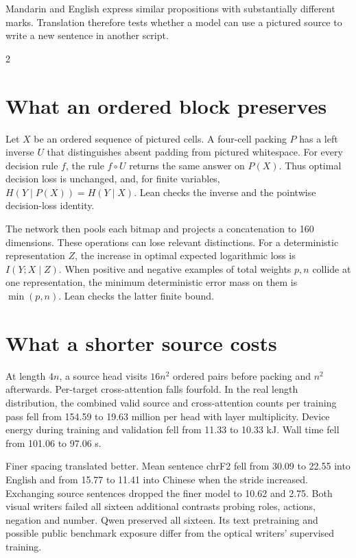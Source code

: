 \newpage
{}
\noindent Mandarin and English express similar propositions with substantially different marks. Translation therefore tests whether a model can use a pictured source to write a new sentence in another script.
\begin{multicols}{2}
\section*{What an ordered block preserves}
Let $X$ be an ordered sequence of pictured cells. A four-cell packing $P$ has a left inverse $U$ that distinguishes absent padding from pictured whitespace. For every decision rule $f$, the rule $f\circ U$ returns the same answer on $P(X)$. Thus optimal decision loss is unchanged, and, for finite variables, $H(Y\mid P(X))=H(Y\mid X)$. Lean checks the inverse and the pointwise decision-loss identity.
\par The network then pools each bitmap and projects a concatenation to 160 dimensions. These operations can lose relevant distinctions. For a deterministic representation $Z$, the increase in optimal expected logarithmic loss is $I(Y;X\mid Z)$. When positive and negative examples of total weights $p,n$ collide at one representation, the minimum deterministic error mass on them is $\min(p,n)$. Lean checks the latter finite bound.
\section*{What a shorter source costs}
At length $4n$, a source head visits $16n^2$ ordered pairs before packing and $n^2$ afterwards. Per-target cross-attention falls fourfold. In the real length distribution, the combined valid source and cross-attention counts per training pass fell from 154.59 to 19.63 million per head with layer multiplicity. Device energy during training and validation fell from 11.33 to 10.33 kJ. Wall time fell from 101.06 to 97.06 s.
\par Finer spacing translated better. Mean sentence chrF2 fell from 30.09 to 22.55 into English and from 15.77 to 11.41 into Chinese when the stride increased. Exchanging source sentences dropped the finer model to 10.62 and 2.75. Both visual writers failed all sixteen additional contrasts probing roles, actions, negation and number. Qwen preserved all sixteen. Its text pretraining and possible public benchmark exposure differ from the optical writers' supervised training.
\end{multicols}
